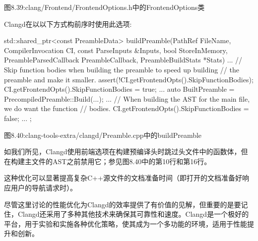 \begin{center}
图8.39:clang/Frontend/FrontendOptions.h中的FrontendOptions类
\end{center}

Clangd在以以下方式构前序时使用此选项:

\begin{cpp}
std::shared_ptr<const PreambleData>
buildPreamble(PathRef FileName, CompilerInvocation CI,
              const ParseInputs &Inputs, bool StoreInMemory,
              PreambleParsedCallback PreambleCallback,
              PreambleBuildStats *Stats) {
  ...
  // Skip function bodies when building the preamble to speed up building
  // the preamble and make it smaller.
  assert(!CI.getFrontendOpts().SkipFunctionBodies);
  CI.getFrontendOpts().SkipFunctionBodies = true;
  ...
  auto BuiltPreamble = PrecompiledPreamble::Build(...);
  ...
  // When building the AST for the main file, we do want the function
  // bodies.
  CI.getFrontendOpts().SkipFunctionBodies = false;
  ...
};
\end{cpp}

\begin{center}
图8.40:clang-tools-extra/clangd/Preamble.cpp中的buildPreamble
\end{center}

如我们所见，Clangd使用前端选项在构建预编译头时跳过头文件中的函数体，但在构建主文件的AST之前禁用它；参见图8.40中的第10行和第16行。

这种优化可以显著提高复杂C++源文件的文档准备时间（即打开的文档准备好响应用户的导航请求时）。

尽管这里讨论的性能优化为Clangd的效率提供了有价值的见解，但重要的是要记住，Clangd还采用了多种其他技术来确保其可靠性和速度。Clangd是一个极好的平台，用于实验和实施各种优化策略，使其成为一个多功能的环境，适用于性能提升和创新。












































